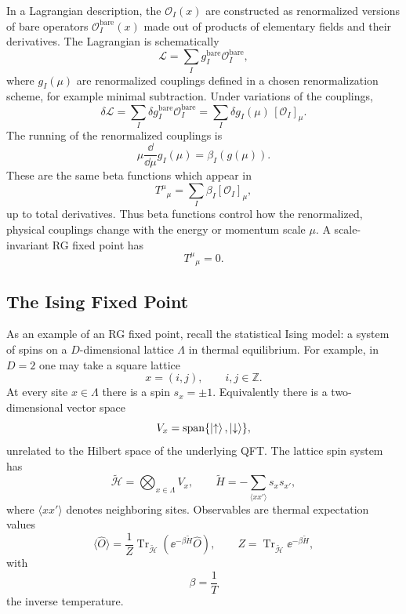In a Lagrangian description, the \(\mathcal O_I(x)\) are constructed as
renormalized versions of bare operators \(\mathcal O_I^{\mathrm{bare}}(x)\)
made out of products of elementary fields and their derivatives.  The
Lagrangian is schematically
\[
  \mathcal L=\sum_I g_I^{\mathrm{bare}}\mathcal O_I^{\mathrm{bare}},
\]
where \(g_I(\mu)\) are renormalized couplings defined in a chosen
renormalization scheme, for example minimal subtraction.  Under
variations of the couplings,
\[
  \delta\mathcal L
  =
  \sum_I \delta g_I^{\mathrm{bare}}\mathcal O_I^{\mathrm{bare}}
  =
  \sum_I \delta g_I(\mu)\,[\mathcal O_I]_\mu .
\]
The running of the renormalized couplings is
\[
  \mu\frac{\dd}{\dd\mu}g_I(\mu)=\beta_I(g(\mu)).
\]
These are the same beta functions which appear in
\[
  T^\mu{}_\mu=\sum_I\beta_I[\mathcal O_I]_\mu,
\]
up to total derivatives.  Thus beta functions control how the
renormalized, physical couplings change with the energy or momentum
scale \(\mu\).  A scale-invariant RG fixed point has
\[
  T^\mu{}_\mu=0.
\]

\subsection{The Ising Fixed Point}

As an example of an RG fixed point, recall the statistical Ising model:
a system of spins on a \(D\)-dimensional lattice \(\Lambda\) in thermal
equilibrium.  For example, in \(D=2\) one may take a square lattice
\[
  x=(i,j),\qquad i,j\in\mathbb Z.
\]
At every site \(x\in\Lambda\) there is a spin \(s_x=\pm1\).  Equivalently
there is a two-dimensional vector space
\[
  V_x=\operatorname{span}\{\ket{\uparrow},\ket{\downarrow}\},
\]
unrelated to the Hilbert space of the underlying QFT.  The lattice spin
system has
\[
  \widetilde{\mathcal H}=\bigotimes_{x\in\Lambda}V_x,
  \qquad
  \widetilde H=-\sum_{\langle x x'\rangle}s_xs_{x'},
\]
where \(\langle x x'\rangle\) denotes neighboring sites.  Observables are
thermal expectation values
\[
  \langle\widehat O\rangle
  =
  \frac1Z\operatorname{Tr}_{\widetilde{\mathcal H}}
  \left(\ee^{-\beta\widetilde H}\widehat O\right),
  \qquad
  Z=\operatorname{Tr}_{\widetilde{\mathcal H}}\ee^{-\beta\widetilde H},
\]
with
\[
  \beta=\frac1T
\]
the inverse temperature.

